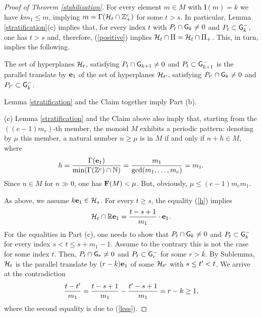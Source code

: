 \begin{proof}[Proof of Theorem \ref{stabilization}]
For every element $m\in M$ with $\textbf{l}(m)=k$ we have $km_1\le m$, implying $m=\Gamma(\mathcal{H}_t\cap\mathbb Z_+^e)$ for some $t>s$. In particular, Lemma  \ref{stratification}(c) implies that, for every index $t$ with $P_t\cap\mathsf{G}_k\not=0$ and $P_t\subset\mathsf{G}_k^-$, one has $t>s$ and, therefore, (\ref{positive}) implies $\mathcal{H}_t\cap\Pi=\mathcal{H}_t\cap\Pi_+$. This, in turn, implies the following.

\medskip{} The set of hyperplanes $\mathcal{H}_t$, satisfying $P_t\cap\mathsf{G}_{k+1}\not=0$ and $P_t\subset\mathsf{G}_{k+1}^-$ is the parallel translate by $\mathbf{e}_1$ of the set of hyperplanes $\H_{t\rq{}}$, satisfying $P_{t\rq{}}\cap\G_k\not=0$ and $P_{t\rq{}}\subset\G_k^-$. 

\medskip Lemma \ref{stratification} and the Claim together imply Part (b). 

\medskip(c) Lemma \ref{stratification} and the Claim above also imply that, starting from the $((e-1)m_e)$-th member, the monoid $M$ exhibits a periodic pattern: denoting by $\mu$ this member, a natural number $n\ge\mu$ is in $M$ if and only if $n+h\in M$, where
\begin{equation}\label{h}
h=\frac{\Gamma(\mathbf{e}_1)}{\min(\Gamma(\mathbb Z^e)\cap\mathbb N)}=\frac{m_1}{\gcd(m_1,\ldots,m_e)}=m_1.
\end{equation}
Since $n\in M$ for $n\gg0$, one has $\mathbf{F}(M)<\mu$. But, obviously, $\mu\le(e-1)m_em_1$.

As above, we assume $k\mathbf{e}_1\in\mathcal{H}_s$. For every $t\ge s$, the equality (\ref{h}) implies 
\begin{equation}\label{less}
\mathcal{H}_t\cap\mathbb R\mathbf{e}_1=\frac{t-s+1}{m_1}\cdot\mathbf{e}_1.
\end{equation}
For the equalities in Part (c), one needs to show that $P_t\cap\mathsf{G}_k\not=0$ and $P_t\subset\mathsf{G}_k^-$ for every index $s<t\le s+m_1-1$. Assume to the contrary this is not the case for some index $t$. Then, $P_t\cap\mathsf{G}_r\not=0$ and $P_t\subset\mathsf{G}_r^-$ for some $r>k$. By Sublemma, $\mathcal{H}_t$ is the parallel translate by $(r-k)\mathbf{e}_1$ of some $\H_{t\rq{}}$ with $s\le t\rq{}<t$. We arrive at the contradiction
\begin{align*}
\frac{t-t\rq{}}{m_1}=\frac{t-s+1}{m_1}-\frac{t\rq{}-s+1}{m_1}=r-k \ge 1,
\end{align*}
where the second equality is due to (\ref{less}).
\end{proof}